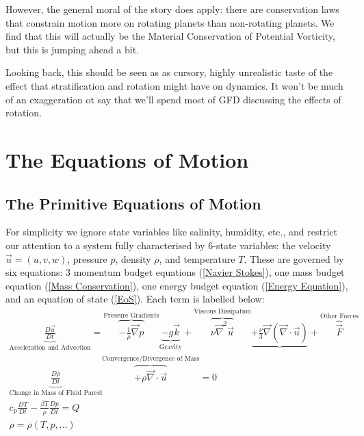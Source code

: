 However, the general moral of the story does apply: there are conservation laws that constrain motion more on rotating planets than non-rotating planets. We find that this will actually be the Material Conservation of Potential Vorticity, but this is jumping ahead a bit.

Looking back, this should be seen as as cursory, highly unrealistic taste of the effect that stratification and rotation might have on dynamics. It won't be much of an exaggeration ot say that we'll spend most of GFD discussing the effects of rotation.

\chapter{The Equations of Motion}\label{EoM GFD}

\section{The Primitive Equations of Motion}

For simplicity we ignore state variables like salinity, humidity, etc., and restrict our attention to a system fully characterised by 6-state variables: the velocity $\vec{u}=(u,v,w)$, pressure $p$, density $\rho$, and temperature $T$. These are governed by six equations: 3 momentum budget equations (\ref{Navier Stokes}), one mass budget equation (\ref{Mass Conservation}), one energy budget equation (\ref{Energy Equation}), and an equation of state (\ref{EoS}). Each term is labelled below:
\begin{gather}
    \boxed{\underbrace{\frac{D\vec{u}}{Dt}}_{\text{Acceleration and Advection}}
    =\overbrace{-\frac{1}{\rho}\vec{\nabla}p}^\text{Pressure Gradients}\underbrace{-g\vec{k}}_\text{Gravity}+\overbrace{\nu\vec{\nabla}^2\vec{u}}^\text{Viscous Dissipation}\underbrace{+\frac{\nu}{3}\vec{\nabla}(\vec{\nabla}\cdot\vec{u})}_\text{}+\overbrace{\vec{F}}^\text{Other Forces}}
    \label{Navier Stokes}
    \\
    \boxed{\underbrace{\frac{D\rho}{Dt}}_\text{Change in Mass of Fluid Parcel}\overbrace{+\rho\vec{\nabla}\cdot\vec{u}}^\text{Convergence/Divergence of Mass}=0}
    \label{Mass Conservation}
    \\
    \boxed{c_p\frac{DT}{Dt}-\frac{\beta T}{\rho}\frac{Dp}{Dt}=Q}
    \label{Energy Equation}
    \\
    \boxed{\rho=\rho(T,p,\ldots)}
    \label{EoS}
\end{gather}

